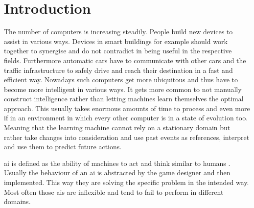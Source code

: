 \section{Introduction}

The number of computers is increasing steadily. People build new devices to assist in various ways. Devices in smart buildings for example should work together to synergise and do not contradict in being useful in the respective fields. Furthermore automatic cars have to communicate with other cars and the traffic infrastructure to safely drive and reach their destination in a fast and efficient way. Nowadays such computers get more ubiquitous and thus have to become more intelligent in various ways. It gets more common to not manually construct intelligence rather than letting machines learn themselves the optimal approach. This usually takes enormous amounts of time to process and even more if in an environment in which every other computer is in a state of evolution too. Meaning that the learning machine cannot rely on a stationary domain but rather take changes into consideration and use past events as references, interpret and use them to predict future actions.

\bigskip

\ac{ai} is defined as the ability of machines to act and think similar to humans . Usually the behaviour of an \ac{ai} is abstracted by the game designer and then implemented. This way they are solving the specific problem in the intended way. Most often those \acp{ai} are inflexible and tend to fail to perform in different domains.